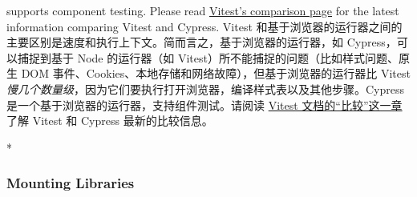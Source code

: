 \begin{paracol}{2}
supports component testing. Please read
\href{https://vitest.dev/guide/comparisons.html\#cypress}{Vitest's
comparison page} for the latest information comparing Vitest and
Cypress.
\switchcolumn
Vitest
和基于浏览器的运行器之间的主要区别是速度和执行上下文。简而言之，基于浏览器的运行器，如
Cypress，可以捕捉到基于 Node 的运行器（如
Vitest）所不能捕捉的问题（比如样式问题、原生 DOM
事件、Cookies、本地存储和网络故障），但基于浏览器的运行器比 Vitest
\emph{慢几个数量级}，因为它们要执行打开浏览器，编译样式表以及其他步骤。Cypress
是一个基于浏览器的运行器，支持组件测试。请阅读
\href{https://vitest.dev/guide/comparisons.html\#cypress}{Vitest
文档的``比较''这一章} 了解 Vitest 和 Cypress 最新的比较信息。
\end{paracol}



\begin{paracol}{2}
 
\switchcolumn[0]*%
\subsubsection{Mounting Libraries}
\switchcolumn

\end{paracol}

